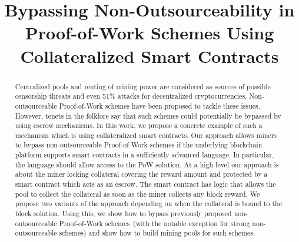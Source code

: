 \documentclass[11pt]{article}
\newcommand{\poolname}{ErgoPool\xspace}
\begin{document}
\title{Bypassing Non-Outsourceability in Proof-of-Work Schemes Using Collateralized Smart Contracts}
\maketitle

\begin{abstract}
    Centralized pools and renting of mining power are considered as sources of possible censorship threats and even 51\%
    attacks for decentralized cryptocurrencies. Non-outsourceable Proof-of-Work schemes have been proposed to tackle these issues. However, tenets in the folklore say that such schemes could potentially be bypassed by using escrow mechanisms.
    In this work, we propose a concrete example of such a mechanism which is using collateralized smart contracts. Our approach allows miners to bypass non-outsourceable Proof-of-Work schemes
    if the underlying blockchain platform supports smart contracts in a sufficiently advanced language. In particular, the language
    should allow access to the PoW solution.
    At a high level our approach is about the miner locking collateral covering the reward amount and protected by a smart
    contract which acts as an escrow. The smart contract has logic that allows the pool to collect the collateral as soon as the miner collects any block reward. We propose two variants of the approach depending on when the collateral is bound to the block solution. Using this, we show how to bypass
    previously proposed non-outsourceable Proof-of-Work schemes~(with the notable exception for strong non-outsourceable schemes)
     and show how to build mining pools for such schemes.

\end{abstract}
\end{document}
